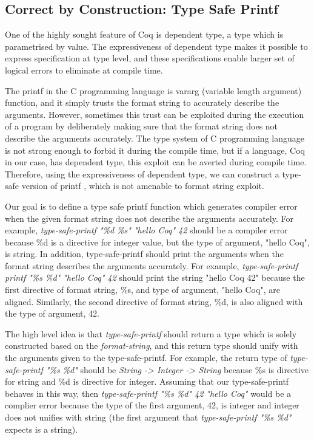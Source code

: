  \subsection{Correct by Construction: Type Safe Printf}
 \label{sec:deplambda}
  One of the highly sought feature of Coq is dependent type, 
  a type which is parametrised by value.  
  The expressiveness of dependent type makes it possible
  to express specification at type level,  and these specifications enable larger 
  set of  logical errors to eliminate at compile time. 
  
 
The printf in the C programming language is vararg (variable length argument) function, 
and it simply trusts the format string to accurately describe the arguments.  However, 
sometimes this trust can be exploited during the execution of a program by deliberately 
making sure that  the format string does not describe the arguments accurately.  
The type system of C programming language is not strong enough to forbid 
it during the compile time,  but if a language, Coq in our case, has  dependent 
type,  this exploit can be averted during compile time.  Therefore, 
using the expressiveness of dependent type, we can construct a type-safe version of 
printf \citep{Pierce:2004:ATT:1076265}, which is not amenable to format string exploit.


 Our goal is to define a type safe printf  function which generates compiler error 
 when the given format string does not describe the 
 arguments accurately.  For example,  \textit{type-safe-printf "\%d \%s" "hello Coq" 42} should be a 
 compiler error because
 \%d is a directive for integer value,  but the type of argument, "hello Coq", is string.  
 In addition, 
 type-safe-printf should print the arguments when the format string describes the 
 arguments accurately. For example, 
 \textit{type-safe-printf printf "\%s \%d" "hello Coq" 42} should print the string "hello Coq  42" because the first directive 
 of format string, \%s, and type of argument, "hello Coq", are aligned.  Similarly, the second directive 
 of format string, \%d, is also aligned with the type of argument, 42. 
 
The high level idea is that \textit{type-safe-printf} should return a 
type which is solely constructed based on the \emph{format-string}, and 
this return type should unify with the arguments given to the type-safe-printf.  
For example,  the return type of  \textit{type-safe-printf "\%s \%d"} should be 
\textit{String -> Integer -> String} because \%s is directive for string and 
\%d is directive for integer.  Assuming that our type-safe-printf behaves in 
this way,  then \textit{type-safe-printf "\%s \%d" 42 "hello Coq"} would be 
a complier error because the type of the first argument, 42, is integer and 
integer does not unifies with string (the first argument that  
\textit{type-safe-printf "\%s \%d"} expects is a string). 


